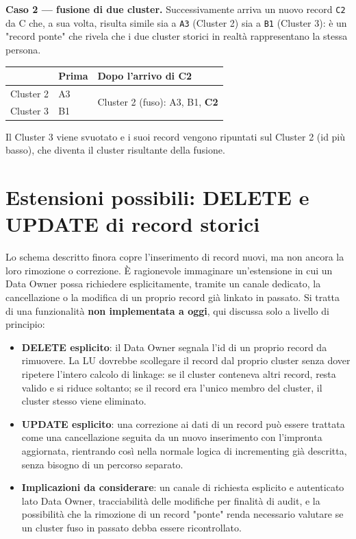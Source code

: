 \documentclass[11pt,a4paper]{article}
\begin{document}
\noindent\textbf{Caso 2 --- fusione di due cluster.} Successivamente arriva un
nuovo record \texttt{C2} da C che, a sua volta, risulta simile sia a
\texttt{A3} (Cluster 2) sia a \texttt{B1} (Cluster 3): \`e un "record ponte"
che rivela che i due cluster storici in realt\`a rappresentano la stessa
persona.

\begin{table}[h!]
\centering
\begin{tabular}{@{}lll@{}}
\toprule
 & \textbf{Prima} & \textbf{Dopo l'arrivo di C2} \\
\midrule
Cluster 2 & A3  & \multirow{2}{*}{Cluster 2 (fuso): A3, B1, \textbf{C2}} \\
Cluster 3 & B1  &  \\
\bottomrule
\end{tabular}
\end{table}

Il Cluster 3 viene svuotato e i suoi record vengono ripuntati sul Cluster 2
(id pi\`u basso), che diventa il cluster risultante della fusione.

\section{Estensioni possibili: DELETE e UPDATE di record storici}

Lo schema descritto finora copre l'inserimento di record nuovi, ma non ancora
la loro rimozione o correzione. \`E ragionevole immaginare un'estensione in
cui un Data Owner possa richiedere esplicitamente, tramite un canale
dedicato, la cancellazione o la modifica di un proprio record gi\`a linkato
in passato. Si tratta di una funzionalit\`a \textbf{non implementata a oggi},
qui discussa solo a livello di principio:

\begin{itemize}
    \item \textbf{DELETE esplicito}: il Data Owner segnala l'id di un proprio
        record da rimuovere. La LU dovrebbe scollegare il record dal proprio
        cluster senza dover ripetere l'intero calcolo di linkage: se il
        cluster conteneva altri record, resta valido e si riduce soltanto; se
        il record era l'unico membro del cluster, il cluster stesso viene
        eliminato.
    \item \textbf{UPDATE esplicito}: una correzione ai dati di un record pu\`o
        essere trattata come una cancellazione seguita da un nuovo inserimento
        con l'impronta aggiornata, rientrando cos\`i nella normale logica di
        incrementing gi\`a descritta, senza bisogno di un percorso separato.
    \item \textbf{Implicazioni da considerare}: un canale di richiesta
        esplicito e autenticato lato Data Owner, tracciabilit\`a delle
        modifiche per finalit\`a di audit, e la possibilit\`a che la rimozione
        di un record "ponte" renda necessario valutare se un cluster fuso in
        passato debba essere ricontrollato.
\end{itemize}
\end{document}
